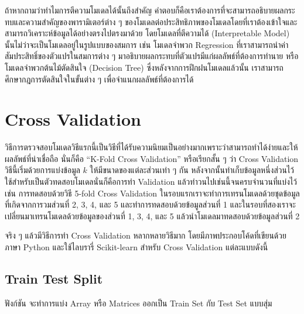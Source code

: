 ถ้าหากถามว่าทำไมการตีความโมเดลได้นั้นถึงสำคัญ คำตอบก็คือเราต้องการที่จะสามารถอธิบายผลกระทบและความสำคัญของพารามิเตอร์ต่าง ๆ 
ของโมเดลต่อประสิทธิภาพของโมเดลโดยที่เราต้องเข้าใจและสามารถวิเคราะห์ข้อมูลได้อย่างตรงไปตรงมาด้วย โดยโมเดลที่ตีความได้ (Interpretable 
Model) นั้นไม่ว่าจะเป็นโมเดลอยู่ในรูปแบบของสมการ เช่น โมเดลจำพวก Regression ที่เราสามารถนำค่าสัมประสิทธิ์ของตัวแปรในสมการต่าง ๆ 
มาอธิบายผลกระทบที่ตัวแปรมีแก่ผลลัพธ์ที่ต้องการทำนาย หรือโมเดลจำพวกต้นไม้ตัดสินใจ (Decision Tree) ซึ่งหลังจากการฝึกฝนโมเดลแล้วนั้น 
เราสามารถศึกษากฎการตัดสินใจในขั้นต่าง ๆ เพื่อจำแนกผลลัพธ์ที่ต้องการได้

\section{Cross Validation}
\label{sec:cross_val}

วิธีการตรวจสอบโมเดลวิธีแรกนี้เป็นวิธีที่ได้รับความนิยมเป็นอย่างมากเพราะว่าสามารถทำได้ง่ายและให้ผลลัพธ์ที่น่าเชื่อถือ นั่นก็คือ 
\enquote{K-Fold Cross Validation} หรือเรียกสั้น ๆ ว่า Cross Validation วิธีนี้เริ่มด้วยการแบ่งข้อมูล $k$ ให้มีขนาดของแต่ละส่วนเท่า ๆ กัน 
หลังจากนั้นทำเก็บข้อมูลหนึ่งส่วนไว้ใช้สำหรับเป็นตัวทดสอบโมเดลนั่นก็คือการทำ Validation แล้วทําวนไปเช่นนี้จนครบจํานวนที่แบ่งไว้ เช่น 
การทดสอบด้วยวิธี 5-fold Cross Validation ในรอบแรกเราจะทำการเทรนโมเดลด้วยชุดข้อมูลที่เกิดจากการวมส่วนที่ 2, 3, 4, และ 5 
และทำการทดสอบด้วยข้อมูลส่วนที่ 1 และในรอบที่สองเราจะเปลี่ยนมาเทรนโมเดลด้วยข้อมูลของส่วนที่ 1, 3, 4, และ 5 แล้วนำโมเดลมาทดสอบด้วยข้อมูลส่วนที่ 2

จริง ๆ แล้วมีวิธีการทำ Cross Validation หลากหลายวิธีมาก โดยมีภาพประกอบโค้ดที่เขียนด้วยภาษา Python และใช้ไลบรารี่ Scikit-learn 
สำหรับ Cross Validation แต่ละแบบดังนี้

\subsection{Train Test Split}
\label{ssec:train_test_split}

ฟังก์ชัน  จะทำการแบ่ง Array หรือ Matrices ออกเป็น Train Set กับ Test Set แบบสุ่ม

